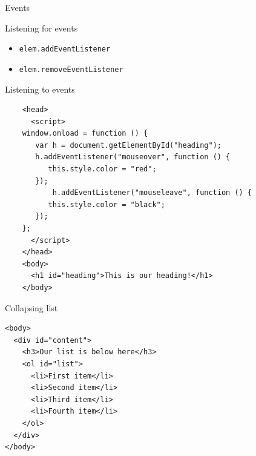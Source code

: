 \documentclass{beamer}
\begin{document}
\begin{frame}[fragile]{Events}
  \begin{block}{Listening for events}
    \begin{itemize}
      \item<1,2> \texttt{elem.addEventListener}
      \item<1,3> \texttt{elem.removeEventListener}
    \end{itemize}
  \end{block}
\end{frame}

\begin{frame}[fragile,label={sec:orgheadline57}]{Listening to events}
 \begin{block}{}
\begin{verbatim}
    <head>
      <script>
	window.onload = function () {
	   var h = document.getElementById("heading");
	   h.addEventListener("mouseover", function () {
	      this.style.color = "red";
	   });
           h.addEventListener("mouseleave", function () {
	      this.style.color = "black";
	   });
	};
      </script>
    </head>
    <body>
      <h1 id="heading">This is our heading!</h1>
    </body>
\end{verbatim}
\end{block}
\end{frame}
\begin{frame}[fragile,label={sec:orgheadline58}]{Collapsing list}
 \begin{block}{}
\begin{verbatim}
<body>
  <div id="content">
    <h3>Our list is below here</h3>
    <ol id="list">
      <li>First item</li>
      <li>Second item</li>
      <li>Third item</li>
      <li>Fourth item</li>
    </ol>
  </div>
</body>
\end{verbatim}
\end{block}
\end{frame}
\end{document}
